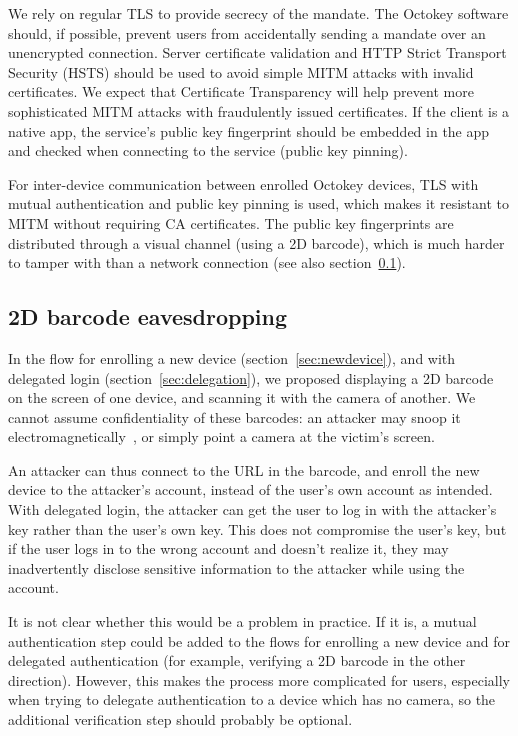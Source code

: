 We rely on regular TLS to provide secrecy of the mandate. The Octokey software should, if possible,
prevent users from accidentally sending a mandate over an unencrypted connection. Server certificate
validation and HTTP Strict Transport Security (HSTS) should be used to avoid simple MITM attacks
with invalid certificates. We expect that Certificate Transparency will help prevent more
sophisticated MITM attacks with fraudulently issued certificates. If the client is a native app, the
service's public key fingerprint should be embedded in the app and checked when connecting to the
service (public key pinning).

For inter-device communication between enrolled Octokey devices, TLS with mutual authentication and
public key pinning is used, which makes it resistant to MITM without requiring CA certificates. The
public key fingerprints are distributed through a visual channel (using a 2D barcode), which is much
harder to tamper with than a network connection (see also section~\ref{sec:barcode-intercept}).

\subsection{2D barcode eavesdropping}\label{sec:barcode-intercept}

In the flow for enrolling a new device (section~\ref{sec:newdevice}), and with delegated login
(section~\ref{sec:delegation}), we proposed displaying a 2D barcode on the screen of one device, and
scanning it with the camera of another. We cannot assume confidentiality of these barcodes: an
attacker may snoop it electromagnetically~\cite{Kuhn05}, or simply point a camera at the victim's
screen.

An attacker can thus connect to the URL in the barcode, and enroll the new device to the attacker's
account, instead of the user's own account as intended. With delegated login, the attacker can get
the user to log in with the attacker's key rather than the user's own key. This does not compromise
the user's key, but if the user logs in to the wrong account and doesn't realize it, they may
inadvertently disclose sensitive information to the attacker while using the account.

It is not clear whether this would be a problem in practice. If it is, a mutual authentication step
could be added to the flows for enrolling a new device and for delegated authentication (for
example, verifying a 2D barcode in the other direction). However, this makes the process more
complicated for users, especially when trying to delegate authentication to a device which has no
camera, so the additional verification step should probably be optional.


